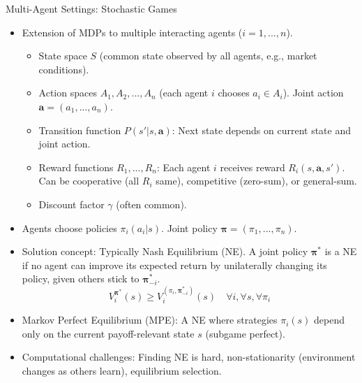 \documentclass[10pt]{beamer}
\begin{document}

\begin{frame}{Multi-Agent Settings: Stochastic Games}
    \begin{itemize}
        \item Extension of MDPs to multiple interacting agents ($i=1, ..., n$).
        \begin{itemize}
            \item State space $S$ (common state observed by all agents, e.g., market conditions).
            \item Action spaces $A_1, A_2, ..., A_n$ (each agent $i$ chooses $a_i \in A_i$). Joint action $\mathbf{a} = (a_1, ..., a_n)$.
            \item Transition function $P(s'|s, \mathbf{a})$: Next state depends on current state and joint action.
            \item Reward functions $R_1, ..., R_n$: Each agent $i$ receives reward $R_i(s, \mathbf{a}, s')$. Can be cooperative (all $R_i$ same), competitive (zero-sum), or general-sum.
            \item Discount factor $\gamma$ (often common).
        \end{itemize}
        \vspace{0.2cm}
        \item Agents choose policies $\pi_i(a_i|s)$. Joint policy $\boldsymbol{\pi} = (\pi_1, ..., \pi_n)$.
        \vspace{0.2cm}
        \item Solution concept: Typically Nash Equilibrium (NE). A joint policy $\boldsymbol{\pi}^*$ is a NE if no agent can improve its expected return by unilaterally changing its policy, given others stick to $\boldsymbol{\pi}^*_{-i}$.
        \begin{equation*}
           V_i^{\boldsymbol{\pi}^*}(s) \geq V_i^{(\pi_i, \boldsymbol{\pi}^*_{-i})}(s) \quad \forall i, \forall s, \forall \pi_i
        \end{equation*}
        \vspace{0.2cm}
        \item Markov Perfect Equilibrium (MPE): A NE where strategies $\pi_i(s)$ depend only on the current payoff-relevant state $s$ (subgame perfect).
        \vspace{0.2cm}
        \item Computational challenges: Finding NE is hard, non-stationarity (environment changes as others learn), equilibrium selection.
    \end{itemize}
\end{frame}
\end{document}
